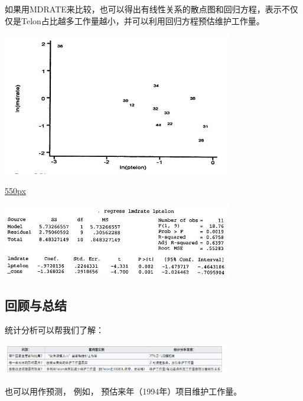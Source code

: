 如果用MDRATE来比较，也可以得出有线性关系的散点图和回归方程，表示不仅仅是Telon占比越多工作量越小，并可以利用回归方程预估维护工作量。


\includegraphics[width=10cm]{maxwell_f554.jpg}

\href{文件:maxwell_e5.34.jpg}{550px}

\includegraphics[width=10cm]{maxwell_e534.jpg}


\hypertarget{ux603bux7ed3ux62a5ux544a}{%
\subsection{回顾与总结}\label{ux603bux7ed3ux62a5ux544a}}

统计分析可以帮我们了解：


\includegraphics[width=10cm]{Screenshotfrom2023-01-0420-18-25.png}

也可以用作预测， 例如， 预估来年（1994年）项目维护工作量。

